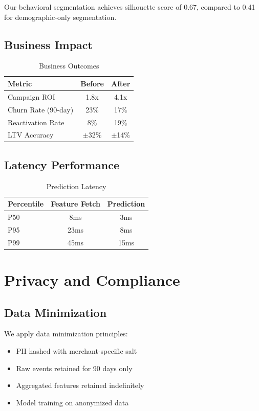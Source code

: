 \documentclass[11pt,a4paper]{article}
\begin{document}
Our behavioral segmentation achieves silhouette score of 0.67, compared to 0.41 for demographic-only segmentation.

\subsection{Business Impact}

\begin{table}[h]
\centering
\caption{Business Outcomes}
\begin{tabular}{lcc}
\toprule
\textbf{Metric} & \textbf{Before} & \textbf{After} \\
\midrule
Campaign ROI & 1.8x & 4.1x \\
Churn Rate (90-day) & 23\% & 17\% \\
Reactivation Rate & 8\% & 19\% \\
LTV Accuracy & $\pm$32\% & $\pm$14\% \\
\bottomrule
\end{tabular}
\end{table}

\subsection{Latency Performance}

\begin{table}[h]
\centering
\caption{Prediction Latency}
\begin{tabular}{lcc}
\toprule
\textbf{Percentile} & \textbf{Feature Fetch} & \textbf{Prediction} \\
\midrule
P50 & 8ms & 3ms \\
P95 & 23ms & 8ms \\
P99 & 45ms & 15ms \\
\bottomrule
\end{tabular}
\end{table}

\section{Privacy and Compliance}

\subsection{Data Minimization}

We apply data minimization principles:

\begin{itemize}
    \item PII hashed with merchant-specific salt
    \item Raw events retained for 90 days only
    \item Aggregated features retained indefinitely
    \item Model training on anonymized data
\end{itemize}
\end{document}
